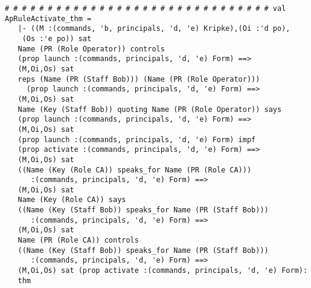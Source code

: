 \documentclass{report}
\begin{document}
\begin{session}
  \begin{scriptsize}
\begin{verbatim}
# # # # # # # # # # # # # # # # # # # # # # # # # # # # # # # val ApRuleActivate_thm =
   |- ((M :(commands, 'b, principals, 'd, 'e) Kripke),(Oi :'d po),
    (Os :'e po)) sat
   Name (PR (Role Operator)) controls
   (prop launch :(commands, principals, 'd, 'e) Form) ==>
   (M,Oi,Os) sat
   reps (Name (PR (Staff Bob))) (Name (PR (Role Operator)))
     (prop launch :(commands, principals, 'd, 'e) Form) ==>
   (M,Oi,Os) sat
   Name (Key (Staff Bob)) quoting Name (PR (Role Operator)) says
   (prop launch :(commands, principals, 'd, 'e) Form) ==>
   (M,Oi,Os) sat
   (prop launch :(commands, principals, 'd, 'e) Form) impf
   (prop activate :(commands, principals, 'd, 'e) Form) ==>
   (M,Oi,Os) sat
   ((Name (Key (Role CA)) speaks_for Name (PR (Role CA)))
      :(commands, principals, 'd, 'e) Form) ==>
   (M,Oi,Os) sat
   Name (Key (Role CA)) says
   ((Name (Key (Staff Bob)) speaks_for Name (PR (Staff Bob)))
      :(commands, principals, 'd, 'e) Form) ==>
   (M,Oi,Os) sat
   Name (PR (Role CA)) controls
   ((Name (Key (Staff Bob)) speaks_for Name (PR (Staff Bob)))
      :(commands, principals, 'd, 'e) Form) ==>
   (M,Oi,Os) sat (prop activate :(commands, principals, 'd, 'e) Form):
   thm
\end{verbatim}
  \end{scriptsize}
\end{session}
\end{document}
